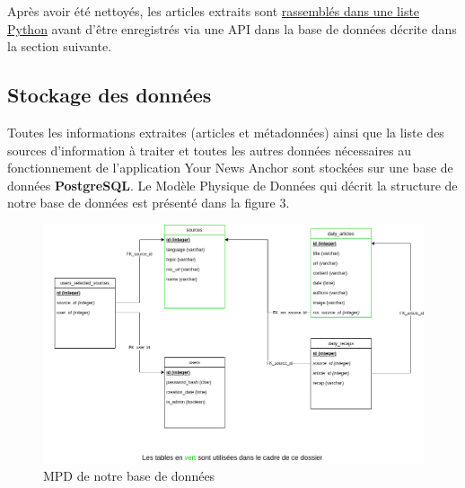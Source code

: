 \documentclass[french]{article}
\begin{document}
    Après avoir été nettoyés, les articles extraits sont \href{https://github.com/vinpap/your_news_anchor/blob/5deffe3be7453d998b2377548902759869e1926d/extract_articles.py#L51}{rassemblés dans une liste Python} avant d'être enregistrés via une API dans la base de données décrite dans la section suivante.

    \subsection{Stockage des données}

    Toutes les informations extraites (articles et métadonnées) ainsi que la liste des sources d'information à traiter et toutes les autres données nécessaires au fonctionnement de l'application Your News Anchor sont stockées sur une base de données \textbf{PostgreSQL}. Le Modèle Physique de Données qui décrit la structure de notre base de données est présenté dans la figure 3.

    \begin{figure}[h]
        \includegraphics[width=12cm]{mpd_e1}
        \centering
        \caption{MPD de notre base de données}
        \centering
    \end{figure}
\end{document}
